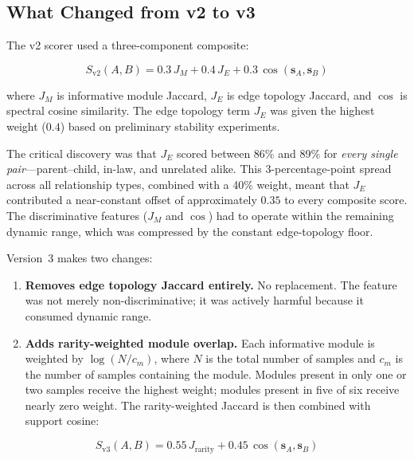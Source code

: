 \documentclass{../yalumba}
\begin{document}
\subsection{What Changed from v2 to v3}

The v2 scorer used a three-component composite:

\begin{equation}
  S_{\text{v2}}(A, B) = 0.3 \, J_M + 0.4 \, J_E + 0.3 \, \cos(\mathbf{s}_A, \mathbf{s}_B)
  \label{eq:v2-score}
\end{equation}

\noindent where $J_M$ is informative module Jaccard, $J_E$ is edge topology
Jaccard, and $\cos$ is spectral cosine similarity.  The edge topology term
$J_E$ was given the highest weight ($0.4$) based on preliminary stability
experiments.


The critical discovery was that $J_E$ scored between 86\% and 89\% for
\emph{every single pair}---parent--child, in-law, and unrelated alike.  This
3-percentage-point spread across all relationship types, combined with a 40\%
weight, meant that $J_E$ contributed a near-constant offset of approximately
$0.35$ to every composite score.  The discriminative features ($J_M$ and
$\cos$) had to operate within the remaining dynamic range, which was compressed
by the constant edge-topology floor.

Version~3 makes two changes:

\begin{enumerate}
  \item \textbf{Removes edge topology Jaccard entirely.}  No replacement.
        The feature was not merely non-discriminative; it was actively harmful
        because it consumed dynamic range.

  \item \textbf{Adds rarity-weighted module overlap.}  Each informative module
        is weighted by $\log(N / c_m)$, where $N$ is the total number of
        samples and $c_m$ is the number of samples containing the module.
        Modules present in only one or two samples receive the highest weight;
        modules present in five of six receive nearly zero weight.  The
        rarity-weighted Jaccard is then combined with support cosine:
\end{enumerate}

\begin{equation}
  S_{\text{v3}}(A, B) = 0.55 \, J_{\text{rarity}} + 0.45 \, \cos(\mathbf{s}_A, \mathbf{s}_B)
  \label{eq:v3-score}
\end{equation}
\end{document}
